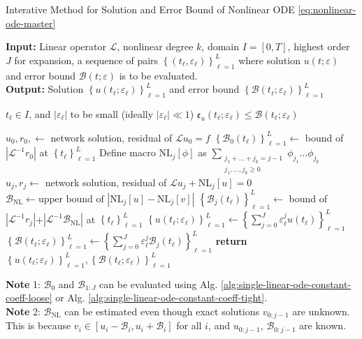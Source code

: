 \documentclass[accepted]{uai2023}
\newcommand{\Err}{\mathfrak{e}}
\newcommand{\Bound}{\mathcal{B}}
\renewcommand{\L}{\mathcal{L}}
\begin{document}
    \begin{algorithm}
        \small
        \caption{Interative Method for Solution and Error Bound of Nonlinear ODE \ref{eq:nonlinear-ode-master}} \label{alg:nonlinear-iterative}
        \textbf{Input:} Linear operator $\L$, nonlinear degree $k$, domain $I=[0, T]$, highest order $J$ for expansion, a sequence of pairs $\left\{(t_\ell, \varepsilon_\ell)\right\}_{\ell=1}^{L}$ where solution $u(t; \varepsilon)$ and error bound $\Bound(t; \varepsilon)$ is to be evaluated. \\
        \textbf{Output:} Solution $\left\{u(t_\ell; \varepsilon_\ell)\right\}_{\ell=1}^{L}$ and error bound $\left\{\Bound(t_\ell; \varepsilon_\ell)\right\}_{\ell=1}^{L}$ 
        \begin{algorithmic}
            \Require $t_\ell \in I$, and $|\varepsilon_\ell|$ to be small (ideally $|\varepsilon_\ell| \ll 1$)
            \Ensure $\Err_{u}(t_\ell; \varepsilon_\ell) \leq \Bound(t_\ell; \varepsilon_\ell)$ 

            \State $u_0, r_0, \gets$ network solution, residual of $\L u_0 = f$
            \State $\left\{\Bound_{0}(t_\ell)\right\}_{\ell=1}^L \gets$ bound of $\left|\L^{-1}r_0\right|$ at $\left\{t_\ell\right\}_{\ell=1}^L$
                \State Define macro $\text{NL}_j[\phi]$ as $\sum_{\substack{j_1 + \dots + j_k = j-1\\ j_1, \dots, j_k \geq 0}} \phi_{j_1} \dots \phi_{j_k}$
                \State $u_j, r_j \gets$ network solution, residual of $\L u_j + \text{NL}_j[u] = 0$
                \State $\Bound_{\text{NL}} \gets \text{upper bound of }|\text{NL}_j[u] - \text{NL}_j[v]|$
                \State $\left\{\Bound_{j}(t_\ell)\right\}_{\ell=1}^L \gets$  bound of $|\L^{-1}r_j|$+$|\L^{-1}\Bound_{\text{NL}}|$ at $\left\{t_\ell\right\}_{\ell=1}^L$
            \EndFor
            \State $\left\{u(t_\ell; \varepsilon_\ell)\right\}_{\ell=1}^L \gets \left\{\sum_{j=0}^{J}\varepsilon_\ell^j u(t_\ell)\right\}_{\ell=1}^L $ 
            \State $\left\{\Bound(t_\ell; \varepsilon_\ell)\right\}_{\ell=1}^L \gets \left\{\sum_{j=0}^{J}\varepsilon_\ell^j \Bound_j(t_\ell)\right\}_{\ell=1}^L $ 
            \State \textbf{return} $\left\{u(t_\ell; \varepsilon_\ell)\right\}_{\ell=1}^L, \left\{\Bound(t_\ell; \varepsilon_\ell)\right\}_{\ell=1}^L$
        \end{algorithmic}
        \vspace{0.5em}

        \textbf{Note} 1: $\Bound_0$ and $\Bound_{1:J}$ can be evaluated using Alg. \ref{alg:single-linear-ode-constant-coeff-loose} or Alg. \ref{alg:single-linear-ode-constant-coeff-tight}.\\
        \textbf{Note} 2: $\Bound_\text{NL}$ can be estimated even though exact solutions $v_{0:j-1}$ are unknown. This is because $v_i \in [u_i - \Bound_i, u_i+\Bound_i]$ for all $i$, and $u_{0:j-1}$, $\Bound_{0:j-1}$ are known.
    \end{algorithm}
\end{document}
